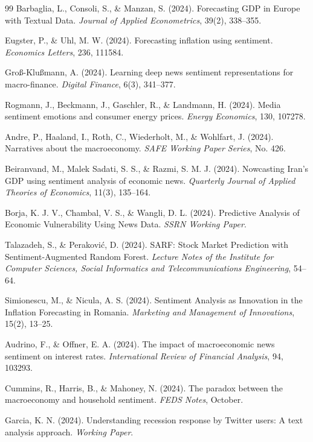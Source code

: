 \documentclass[11pt,twocolumn]{article}
\begin{document}
\begin{thebibliography}{99}
 Barbaglia, L., Consoli, S., \& Manzan, S. (2024). Forecasting GDP in Europe with Textual Data. \textit{Journal of Applied Econometrics}, 39(2), 338--355.

 Eugster, P., \& Uhl, M. W. (2024). Forecasting inflation using sentiment. \textit{Economics Letters}, 236, 111584.

 Groß-Klußmann, A. (2024). Learning deep news sentiment representations for macro-finance. \textit{Digital Finance}, 6(3), 341--377.

 Rogmann, J., Beckmann, J., Gaschler, R., \& Landmann, H. (2024). Media sentiment emotions and consumer energy prices. \textit{Energy Economics}, 130, 107278.

 Andre, P., Haaland, I., Roth, C., Wiederholt, M., \& Wohlfart, J. (2024). Narratives about the macroeconomy. \textit{SAFE Working Paper Series}, No. 426.

 Beiranvand, M., Malek Sadati, S. S., \& Razmi, S. M. J. (2024). Nowcasting Iran's GDP using sentiment analysis of economic news. \textit{Quarterly Journal of Applied Theories of Economics}, 11(3), 135--164.

 Borja, K. J. V., Chambal, V. S., \& Wangli, D. L. (2024). Predictive Analysis of Economic Vulnerability Using News Data. \textit{SSRN Working Paper}.

 Talazadeh, S., \& Peraković, D. (2024). SARF: Stock Market Prediction with Sentiment-Augmented Random Forest. \textit{Lecture Notes of the Institute for Computer Sciences, Social Informatics and Telecommunications Engineering}, 54--64.

 Simionescu, M., \& Nicula, A. S. (2024). Sentiment Analysis as Innovation in the Inflation Forecasting in Romania. \textit{Marketing and Management of Innovations}, 15(2), 13--25.

 Audrino, F., \& Offner, E. A. (2024). The impact of macroeconomic news sentiment on interest rates. \textit{International Review of Financial Analysis}, 94, 103293.

 Cummins, R., Harris, B., \& Mahoney, N. (2024). The paradox between the macroeconomy and household sentiment. \textit{FEDS Notes}, October.

 Garcia, K. N. (2024). Understanding recession response by Twitter users: A text analysis approach. \textit{Working Paper}.


\end{thebibliography}
\end{document}
